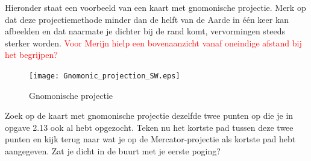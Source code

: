Hieronder staat een voorbeeld van een kaart met gnomonische projectie. Merk op dat deze projectiemethode minder dan de helft van de Aarde in \'e\'en keer kan afbeelden en dat naarmate je dichter bij de rand komt, vervormingen steeds sterker worden. \textcolor{red}{Voor Merijn hielp een bovenaanzicht vanaf oneindige afstand bij het begrijpen?}

\begin{figure}[h]
	\centering
	\texttt{[image: Gnomonic\_projection\_SW.eps]}
	\caption{Gnomonische projectie}
	\label{fig_gnomonic}
\end{figure}

\begin{opgave}
	Zoek op de kaart met gnomonische projectie dezelfde twee punten op die je in opgave 2.13 ook al hebt opgezocht. Teken nu het kortste pad tussen deze twee punten en kijk terug naar wat je op de Mercator-projectie als kortste pad hebt aangegeven. Zat je dicht in de buurt met je eerste poging?
\end{opgave}

\newpage